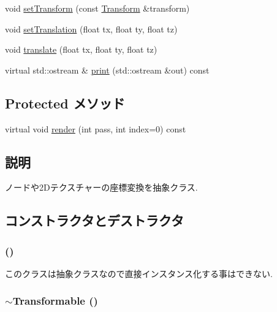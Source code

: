 \begin{CompactItemize}
\item 
void \hyperlink{classm3g_1_1Transformable_05052269aaf19775f3ff1a10d042777e}{setTransform} (const \hyperlink{classm3g_1_1Transform}{Transform} \&transform)
\item 
void \hyperlink{classm3g_1_1Transformable_afd728a7db85b8e12bdafc2b3c08a515}{setTranslation} (float tx, float ty, float tz)
\item 
void \hyperlink{classm3g_1_1Transformable_66d493b8307a85e615c4eb89116f2e09}{translate} (float tx, float ty, float tz)
\item 
virtual std::ostream \& \hyperlink{classm3g_1_1Transformable_6fea17fa1532df3794f8cb39cb4f911f}{print} (std::ostream \&out) const 
\end{CompactItemize}
\subsection*{Protected メソッド}
\begin{CompactItemize}
\item 
virtual void \hyperlink{classm3g_1_1Transformable_1efcb1973989d9963d5bd6d03065d389}{render} (int pass, int index=0) const 
\end{CompactItemize}


\subsection{説明}
ノードや2Dテクスチャーの座標変換を抽象クラス. 

\subsection{コンストラクタとデストラクタ}
\hypertarget{classm3g_1_1Transformable_ca6563203e3e883391c9d0927028aa04}{
\subsubsection[{Transformable}]{ ()}}
\label{classm3g_1_1Transformable_ca6563203e3e883391c9d0927028aa04}


このクラスは抽象クラスなので直接インスタンス化する事はできない. \hypertarget{classm3g_1_1Transformable_89d9c7912ed11a30a312fd8f72b9ab22}{
\subsubsection[{$\sim$Transformable}]{\setlength{\rightskip}{0pt plus 5cm}$\sim${\bf Transformable} ()}}
\label{classm3g_1_1Transformable_89d9c7912ed11a30a312fd8f72b9ab22}


